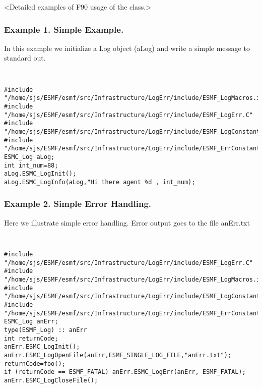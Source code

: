 %


<Detailed examples of F90 usage of the class.>
\subsubsection{Example 1. Simple Example.}

In this example we initialize a Log object (aLog) and write a simple message
to standard out.

{\tt
\begin{verbatim}
#include "/home/sjs/ESMF/esmf/src/Infrastructure/LogErr/include/ESMF_LogMacros.inc"
#include "/home/sjs/ESMF/esmf/src/Infrastructure/LogErr/include/ESMF_LogErr.C"
#include "/home/sjs/ESMF/esmf/src/Infrastructure/LogErr/include/ESMF_LogConstants.inc"
#include "/home/sjs/ESMF/esmf/src/Infrastructure/LogErr/include/ESMF_ErrConstants.inc"
ESMC_Log aLog;
int int_num=88;
aLog.ESMC_LogInit();
aLog.ESMC_LogInfo(aLog,"Hi there agent %d , int_num);
\end{verbatim}
}\tt

\subsubsection{Example 2. Simple Error Handling.}

Here we illustrate simple error handling.  Error output goes to the file anErr.txt
{\tt
\begin{verbatim}
#include "/home/sjs/ESMF/esmf/src/Infrastructure/LogErr/include/ESMF_LogErr.C"
#include "/home/sjs/ESMF/esmf/src/Infrastructure/LogErr/include/ESMF_LogMacros.inc"
#include "/home/sjs/ESMF/esmf/src/Infrastructure/LogErr/include/ESMF_LogConstants.inc"
#include "/home/sjs/ESMF/esmf/src/Infrastructure/LogErr/include/ESMF_ErrConstants.inc"
ESMC_Log anErr;
type(ESMF_Log) :: anErr
int returnCode; 
anErr.ESMC_LogInit();
anErr.ESMC_LogOpenFile(anErr,ESMF_SINGLE_LOG_FILE,"anErr.txt");
returnCode=foo();
if (returnCode == ESMF_FATAL) anErr.ESMC_LogErr(anErr, ESMF_FATAL); 
anErr.ESMC_LogCloseFile();
\end{verbatim}
}\tt

